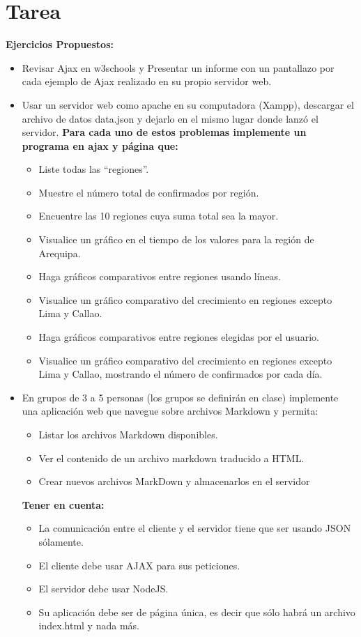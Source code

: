 \documentclass{article}
\begin{document}
 
	\section{Tarea}
	\textbf{Ejercicios Propuestos:}
	\begin{itemize}		
		\item Revisar Ajax en w3schools y Presentar un informe con un pantallazo por cada ejemplo de Ajax realizado en su propio servidor web.
		\item Usar un servidor web como apache en su computadora (Xampp), descargar el archivo de datos data.json y dejarlo en el mismo lugar donde lanzó el servidor. \textbf{Para cada uno de estos problemas implemente un programa en ajax y página que:}
		\begin{itemize}
			\item Liste todas las “regiones”. 
			\item Muestre el número total de confirmados por región.
			\item Encuentre las 10 regiones cuya suma total sea la mayor.
			\item Visualice un gráfico en el tiempo de los valores para la región de Arequipa.
			\item Haga gráficos comparativos entre regiones usando líneas.
			\item Visualice un gráfico comparativo del crecimiento en regiones excepto Lima y Callao.
			\item Haga gráficos comparativos entre regiones elegidas por el usuario.
			\item Visualice un gráfico comparativo del crecimiento en regiones excepto Lima y Callao, mostrando el número de confirmados por cada día.
		\end{itemize}
		\item En grupos de 3 a 5 personas (los grupos se definirán en clase) implemente una aplicación web que navegue sobre archivos Markdown y permita:
		\begin{itemize}
			\item Listar los archivos Markdown disponibles.
			\item Ver el contenido de un archivo markdown traducido a HTML.
			\item Crear nuevos archivos MarkDown y almacenarlos en el servidor
		\end{itemize}
		\textbf{Tener en cuenta:}
		\begin{itemize}
			\item La comunicación entre el cliente y el servidor tiene que ser usando JSON sólamente.
			\item El cliente debe usar AJAX para sus peticiones.
			\item El servidor debe usar NodeJS.
			\item Su aplicación debe ser de página única, es decir que sólo habrá un archivo index.html y nada más.
		\end{itemize}
			
	\end{itemize}
 
\end{document}
